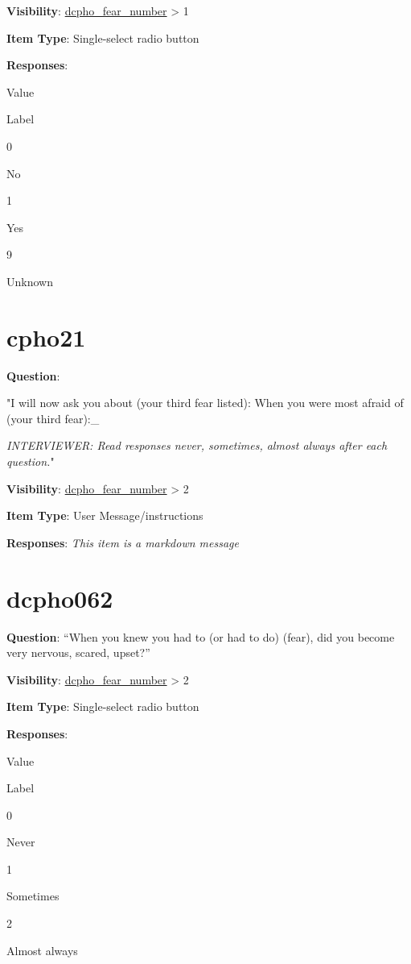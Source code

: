 \documentclass[]{book}
\begin{document}
\textbf{Visibility}: \protect\hyperlink{dcpho_fear_number}{dcpho\_fear\_number} \textgreater{} 1

\textbf{Item Type}: Single-select radio button

\textbf{Responses}:

Value

Label

0

No

1

Yes

9

Unknown

\hypertarget{cpho21}{%
\section{cpho21}\label{cpho21}}

\textbf{Question}:

"I will now ask you about (your third fear listed): When you were most afraid of (your third fear):\_

\emph{INTERVIEWER: Read responses never, sometimes, almost always after each question.}"

\textbf{Visibility}: \protect\hyperlink{dcpho_fear_number}{dcpho\_fear\_number} \textgreater{} 2

\textbf{Item Type}: User Message/instructions

\textbf{Responses}: \emph{This item is a markdown message}

\hypertarget{dcpho062}{%
\section{dcpho062}\label{dcpho062}}

\textbf{Question}: ``When you knew you had to (or had to do) (fear), did you become very nervous, scared, upset?''

\textbf{Visibility}: \protect\hyperlink{dcpho_fear_number}{dcpho\_fear\_number} \textgreater{} 2

\textbf{Item Type}: Single-select radio button

\textbf{Responses}:

Value

Label

0

Never

1

Sometimes

2

Almost always
\end{document}
